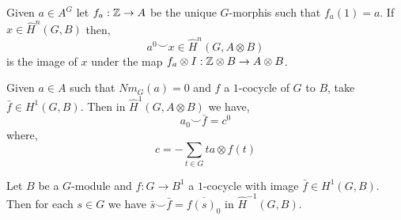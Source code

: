 \documentclass[12pt]{extarticle}
\begin{document}
\begin{lemma}
Given $a \in A^G$ let $f_a : \mathbb{Z} \to A$ be the unique $G$-morphis such that $f_a(1) = a$. If $x \in \hat{H}^n(G, B)$ then,
\[ a^0 \smile x \in \hat{H}^n(G, A \otimes B) \]
is the image of $x$ under the map $f_a \otimes I : \mathbb{Z} \otimes B \to A \otimes B$. 
\end{lemma}

\begin{lemma} \label{second}
Given $a \in A$ such that $Nm_G(a) = 0$ and $f$ a $1$-cocycle of $G$ to $B$, take $\bar{f} \in H^1(G, B)$. Then in $\hat{H}^1(G, A \otimes B)$ we have,
\[ a_0 \smile \bar{f} = c^0 \]
where,
\[ c = - \sum_{t \in G} ta \otimes f(t) \] 
\end{lemma}

\begin{lemma} \label{third}
Let $B$ be a $G$-module and $f : G \to B^1$ a $1$-cocycle with image $\bar{f} \in H^1(G, B)$. Then for each $s \in G$ we have $\bar{s} \smile \bar{f} = \overline{f(s)_0}$ in $\hat{H}^{-1}(G, B)$. 
\end{lemma}
\end{document}
